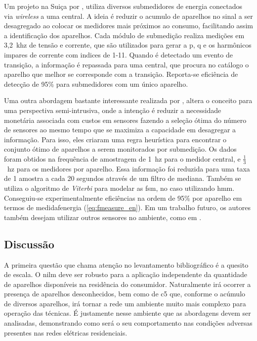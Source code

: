 Um projeto na Suiça por \cite{seminilm_ihome_tomek_2012}, utiliza
diversos submedidores de energia conectados via \emph{wireless} a uma
central. A ideia é reduzir o acumulo de aparelhos no sinal a ser
desagregado ao colocar os medidores mais próximos ao consumo,
facilitando assim a identificação dos aparelhos. Cada módulo de
submedição realiza medições em 3,2~k\acs{hz} de tensão e corrente, que
são utilizados para gerar a \acl{p}, \acl{q} e os harmônicos impares
de corrente com indices de 1-11. Quando é detectado um evento de
transição, a informação é repassada para uma central, que procura no
catálogo o aparelho que melhor se corresponde com a transição.
Reporta-se eficiência de detecção de 95\% para submedidores com um
único aparelho. 

Uma outra abordagem bastante interessante realizada por
\citet*{seminilm_fhmm_empiricalnmeter_2013}, altera o conceito
para uma perspectiva semi-intrusiva, onde a intenção é
reduzir a necessidade monetária associada com custos em
sensores fazendo a seleção ótima do número de sensores ao mesmo tempo
que se maximiza a capacidade em desagregar a informação. Para isso,
eles criaram uma regra heurística para encontrar o conjunto ótimo de
aparelhos a serem monitorados por submedição. Os dados foram obtidos
na frequência de amostragem de 1~\acs{hz} para o medidor central,
e $\frac{1}{3}$~\acs{hz} para os medidores por aparelho. Essa
informação foi reduzida para uma taxa de 1 amostra a cada 20 segundos
através de um filtro de mediana. Também se utiliza o
algoritmo de \emph{Viterbi} para modelar as \gls{fsm}, no caso
utilizando \gls{hmm}. Conseguiu-se experimentalmente eficiências na
ordem de 95\% por aparelho em termos de \acs{medidafenergia}
(\ref{eq:fmeasure_en}). Em um trabalho futuro, os autores também
desejam utilizar outros sensores no ambiente, como em
\cite{seminilm_berges_multisensor_2010}.

\subsection{Discussão}
\label{ssec:nilm_discussao}

A primeira questão que chama atenção no levantamento bibliográfico é a
quesito de escala. O \gls{nilm} deve ser robusto para a aplicação
independente da quantidade de aparelhos disponíveis na residência do
consumidor. Naturalmente irá ocorrer a presença de aparelhos
desconhecidos, bem como de \gls{c5} que, conforme o acúmulo de
diversos aparelhos, irá tornar a rede um ambiente muito mais complexo
para operação das técnicas. É justamente nesse ambiente que as
abordagens devem ser analisadas, demonstrando como será o seu
comportamento nas condições adversas presentes nas redes elétricas
residenciais.

